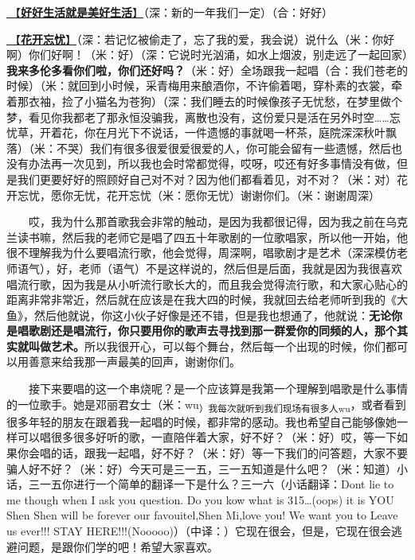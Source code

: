 \documentclass[]{ctexbook}
\begin{document}
\hyperref[live-happy-life-happy]{🎵【\textbf{好好生活就是美好生活}】}（深：新的一年我们一定）（合：好好）

\hyperref[no-worries]{🎵【\textbf{花开忘忧}】}（深：若记忆被偷走了，忘了我的爱，我会说）说什么（米：你好啊）你们好啊！（米：好）（深：它说时光汹涌，如水上烟波，别走远了一起回家）\textbf{我来多伦多看你们啦，你们还好吗？}（米：好）全场跟我一起唱（合：我们苍老的时候）（米：就回到小时候，采青梅用来酿酒你，不许偷着喝，穿朴素的衣裳，牵着那衣袖，捡了小猫名为苍狗）（深：我们睡去的时候像孩子无忧愁，在梦里做个梦，看见你我都老了那永恒没骗我，离散也没有，这份爱只是活在另外时空\ldots\ldots 忘忧草，开着花，你在月光下不说话，一件遗憾的事就喝一杯茶，庭院深深秋叶飘落）（米：不哭）我们有很多很爱很爱很爱的人，你可能会留有一些遗憾，然后也没有办法再一次见到，所以我也会时常都觉得，哎呀，哎还有好多事情没有做，但是我们更要好好的照顾好自己对不对？因为他们都看着见，对不对？（米：对）花开忘忧，愿你无忧，花开忘忧（米：愿你无忧）谢谢你们。（米：谢谢周深）

  哎，我为什么那首歌我会非常的触动，是因为我都很记得，因为我之前在乌克兰读书嘛，然后我的老师它是唱了四五十年歌剧的一位歌唱家，所以他一开始，他很不理解我为什么要唱流行歌，他会觉得，周深啊，唱歌剧才是艺术（深深模仿老师语气），好，老师（语气）不是这样说的，然后但是后面，我就是因为我很喜欢唱流行歌，因为我是从小听流行歌长大的，而且我会觉得流行歌，和大家心贴心的距离非常非常近，然后就在应该是在我大四的时候，我就回去给老师听到我的《大鱼》，然后他就说，你这小伙子好像是还不错，但是我也想通了，他就说：\textbf{无论你是唱歌剧还是唱流行，你只要用你的歌声去寻找到那一群爱你的同频的人，那个其实就叫做艺术。}所以我很开心，可以每个舞台，然后每一个出现的时候，你们都可以用善意来给我那一声最美的回声，谢谢你们。

  接下来要唱的这一个串烧呢？是一个应该算是我第一个理解到唱歌是什么事情的一位歌手。她是邓丽君女士（米：wu\textsubscript{）我每次就听到我们现场有很多人wu}，或者看到很多年轻的朋友在跟着我一起唱的时候，都非常的感动。我也希望自己能够像她一样可以唱很多很多好听的歌，一直陪伴着大家，好不好？（米：好）哎，等一下如果你会唱的话，跟我一起唱，好不好？（米：好）等一下我们的问答题，大家不要骗人好不好？（米：好）今天可是三一五，三一五知道是什么吧？（米：知道）小话，三一五你进行一个简单的翻译一下是什么？三一六（小话翻译：Dont lie to me though when I ask you question. Do you kow what is 315\ldots(oops) it is YOU Shen Shen will be forever our favouitel,Shen Mi,love you! We want you to Leave us ever!!! STAY HERE!!!(Nooooo)）（中译：）它现在很会，但是，它现在很会逃避问题，是跟你们学的吧！希望大家喜欢。
\end{document}
